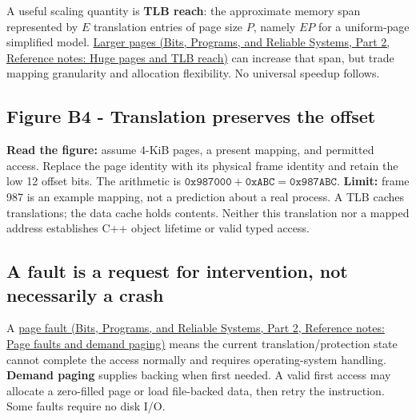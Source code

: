 A useful scaling quantity is \textbf{TLB reach}: the approximate memory span represented by \(E\) translation entries of page size \(P\), namely \(EP\) for a uniform-page simplified model. \href{../01-Bits-Programs-and-Reliable-Systems-P02/main.pdf\#nameddest=appendix-ce688d1acdab}{Larger pages (Bits, Programs, and Reliable Systems, Part 2, Reference notes: Huge pages and TLB reach)} can increase that span, but trade mapping granularity and allocation flexibility. No universal speedup follows.

\subsection{Figure B4 - Translation preserves the offset}\label{05-engine-i-ch002-figure-b4---translation-preserves-the-offset}

\hypertarget{05-engine-i-ch002-figure-b4---translation-preserves-the-offset}{}


\textbf{Read the figure:} assume 4-KiB pages, a present mapping, and permitted access. Replace the page identity with its physical frame identity and retain the low 12 offset bits. The arithmetic is \(\mathtt{0x987000}+\mathtt{0xABC}=\mathtt{0x987ABC}\). \textbf{Limit:} frame 987 is an example mapping, not a prediction about a real process. A TLB caches translations; the data cache holds contents. Neither this translation nor a mapped address establishes C++ object lifetime or valid typed access.

\subsection{A fault is a request for intervention, not necessarily a crash}\label{05-engine-i-ch002-a-fault-is-a-request-for-intervention-not-necessarily-a-crash}

\hypertarget{05-engine-i-ch002-a-fault-is-a-request-for-intervention-not-necessarily-a-crash}{}

A \href{../01-Bits-Programs-and-Reliable-Systems-P02/main.pdf\#nameddest=appendix-cc0909a7ef14}{page fault (Bits, Programs, and Reliable Systems, Part 2, Reference notes: Page faults and demand paging)} means the current translation/protection state cannot complete the access normally and requires operating-system handling. \textbf{Demand paging} supplies backing when first needed. A valid first access may allocate a zero-filled page or load file-backed data, then retry the instruction. Some faults require no disk I/O.

